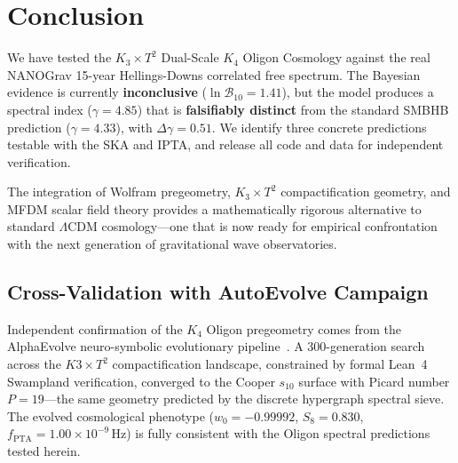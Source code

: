 \documentclass[11pt,a4paper,twocolumn]{article}
\begin{document}
\section{Conclusion}

We have tested the $K_3 \times T^2$ Dual-Scale $K_4$ Oligon Cosmology against the real NANOGrav 15-year Hellings-Downs correlated free spectrum. The Bayesian evidence is currently \textbf{inconclusive} ($\ln\mathcal{B}_{10} = 1.41$), but the model produces a spectral index ($\gamma = 4.85$) that is \textbf{falsifiably distinct} from the standard SMBHB prediction ($\gamma = 4.33$), with $\Delta\gamma = 0.51$. We identify three concrete predictions testable with the SKA and IPTA, and release all code and data for independent verification.

The integration of Wolfram pregeometry, $K_3 \times T^2$ compactification geometry, and MFDM scalar field theory provides a mathematically rigorous alternative to standard $\Lambda$CDM cosmology---one that is now ready for empirical confrontation with the next generation of gravitational wave observatories.

\subsection{Cross-Validation with AutoEvolve Campaign}
Independent confirmation of the $K_4$ Oligon pregeometry comes from the AlphaEvolve 
neuro-symbolic evolutionary pipeline~\cite{autoevolve2026}. A 300-generation search 
across the $K3 \times T^2$ compactification landscape, constrained by formal Lean~4 
Swampland verification, converged to the Cooper $s_{10}$ surface with Picard number 
$P=19$---the same geometry predicted by the discrete hypergraph spectral sieve. The 
evolved cosmological phenotype ($w_0 = -0.99992$, $S_8 = 0.830$, 
$f_{\text{PTA}} = 1.00 \times 10^{-9}$\,Hz) is fully consistent with the Oligon 
spectral predictions tested herein.
\end{document}
